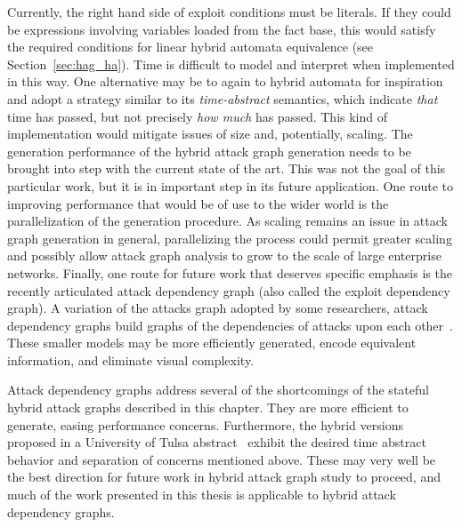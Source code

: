 Currently, the right hand side of exploit conditions must be literals. If they
could be expressions involving variables loaded from the fact base, this would 
satisfy the required conditions for linear hybrid automata equivalence (see
Section~\ref{sec:hag_ha}).
Time is difficult to model and interpret when implemented in this way. One
alternative may be to again to hybrid automata for inspiration and
adopt a strategy similar to its \emph{time-abstract} semantics,
which indicate \emph{that} time has passed, but not precisely \emph{how much}
has passed. This kind of implementation would mitigate issues of size and,
potentially, scaling.
The generation performance of the hybrid attack graph generation needs to be
brought into step with the current state of the art. This was not the goal of
this particular work, but it is in important step in its future application.
One route to improving performance that would be of use to the wider world is
the parallelization of the generation procedure. As scaling remains an issue
in attack graph generation in general, parallelizing the process could permit
greater scaling and possibly allow attack graph analysis to grow to the scale
of large enterprise networks.
Finally, one route for future work that deserves specific emphasis is the recently
articulated attack dependency graph (also called the exploit dependency graph).
A variation of the attacks graph adopted by some researchers, attack dependency
graphs build graphs of the dependencies of attacks upon each 
other~\cite{jajodia2005topological, noel2004managing}. These smaller models may
be more efficiently generated, encode equivalent information, and eliminate 
visual complexity.

Attack dependency graphs address several of the shortcomings of the stateful
hybrid attack graphs described in this chapter. They are more efficient to
generate, easing performance concerns. Furthermore, the hybrid versions proposed
in a University of Tulsa abstract~\cite{louthan2011toward} exhibit the
desired time abstract behavior and separation of concerns mentioned above. These
may very well be the best direction for future work in hybrid attack graph
study to proceed, and much of the work presented in this thesis is applicable to
hybrid attack dependency graphs.

